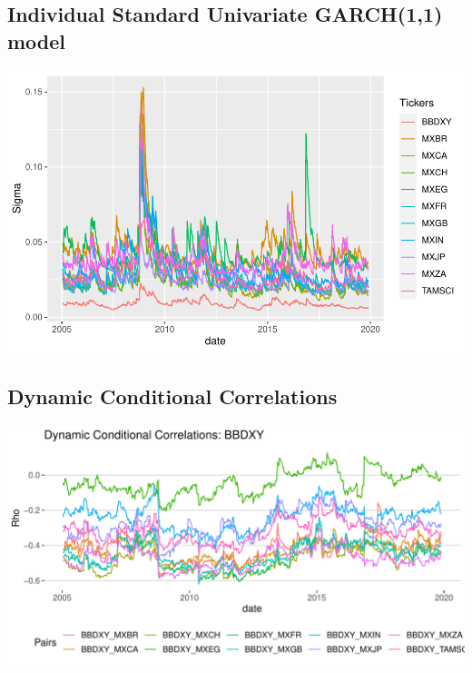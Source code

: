 \documentclass[11pt,preprint, authoryear]{elsarticle}
\let\origfigure\figure
\let\endorigfigure\endfigure
\renewenvironment{figure}[1][2] {
    \expandafter\origfigure\expandafter[H]
} {
    \endorigfigure
}
\numberwithin{equation}{section}
\numberwithin{figure}{section}
\numberwithin{table}{section}
\begin{document}
\hypertarget{individual-standard-univariate-garch11-model}{%
\subsection{Individual Standard Univariate GARCH(1,1)
model}\label{individual-standard-univariate-garch11-model}}

\begin{figure}[H]

\includegraphics{Impact-of-Dollar-Volatility-on-EM-DM-Equity-Markets_files/figure-latex/figure2-1} \hfill{}

\caption{Series Volatility \label{figure2}}\label{fig:figure2}
\end{figure}

\hypertarget{dynamic-conditional-correlations}{%
\subsection{Dynamic Conditional
Correlations}\label{dynamic-conditional-correlations}}

\begin{figure}[H]

\includegraphics{Impact-of-Dollar-Volatility-on-EM-DM-Equity-Markets_files/figure-latex/figure3-1} \hfill{}

\caption{Series Volatility \label{figure3}}\label{fig:figure3}
\end{figure}


\end{document}

